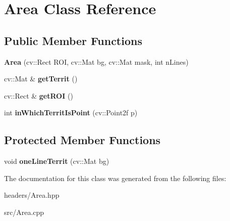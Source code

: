 \hypertarget{classArea}{\section{Area Class Reference}
\label{classArea}
}
\subsection*{Public Member Functions}
\begin{DoxyCompactItemize}
\item 
\hypertarget{classArea_a001d8a1b7164d9ec28b5737c6a9a90c5}{{\bfseries Area} (cv\-::\-Rect R\-O\-I, cv\-::\-Mat bg, cv\-::\-Mat mask, int n\-Lines)}\label{classArea_a001d8a1b7164d9ec28b5737c6a9a90c5}

\item 
\hypertarget{classArea_a3470f64880b8647d16034b970e04c611}{cv\-::\-Mat \& {\bfseries get\-Territ} ()}\label{classArea_a3470f64880b8647d16034b970e04c611}

\item 
\hypertarget{classArea_a1f06bb9d7a4e372092df4b89a221a273}{cv\-::\-Rect \& {\bfseries get\-R\-O\-I} ()}\label{classArea_a1f06bb9d7a4e372092df4b89a221a273}

\item 
\hypertarget{classArea_aa726080825abc4673cc9ec9fc339983e}{int {\bfseries in\-Which\-Territ\-Is\-Point} (cv\-::\-Point2f p)}\label{classArea_aa726080825abc4673cc9ec9fc339983e}

\end{DoxyCompactItemize}
\subsection*{Protected Member Functions}
\begin{DoxyCompactItemize}
\item 
\hypertarget{classArea_a46be5cdc4414e28f3796b891dfb65278}{void {\bfseries one\-Line\-Territ} (cv\-::\-Mat bg)}\label{classArea_a46be5cdc4414e28f3796b891dfb65278}

\end{DoxyCompactItemize}


The documentation for this class was generated from the following files\-:\begin{DoxyCompactItemize}
\item 
headers/Area.\-hpp\item 
src/Area.\-cpp\end{DoxyCompactItemize}
